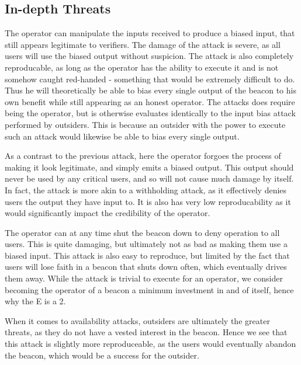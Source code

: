 \subsection{In-depth Threats}

The operator can manipulate the inputs received to produce a biased input, that still appears legitimate to verifiers. The damage of the attack is severe, as all users will use the biased output without suspicion. The attack is also completely reproducable, as long as the operator has the ability to execute it and is not somehow caught red-handed - something that would be extremely difficult to do. Thus he will theoretically be able to bias every single output of the beacon to his own benefit while still appearing as an honest operator. The attacks does require being the operator, but is otherwise evaluates identically to the input bias attack performed by outsiders. This is because an outsider with the power to execute such an attack would likewise be able to bias every single output.

As a contrast to the previous attack, here the operator forgoes the process of making it look legitimate, and simply emits a biased output. This output should never be used by any critical users, and so will not cause much damage by itself. In fact, the attack is more akin to a withholding attack, as it effectively denies users the output they have input to. It is also has very low reproducability as it would significantly impact the credibility of the operator.

The operator can at any time shut the beacon down to deny operation to all users. This is quite damaging, but ultimately not as bad as making them use a biased input. This attack is also easy to reproduce, but limited by the fact that users will lose faith in a beacon that shuts down often, which eventually drives them away. While the attack is trivial to execute for an operator, we consider becoming the operator of a beacon a minimum investment in and of itself, hence why the E is a 2.

When it comes to availability attacks, outsiders are ultimately the greater threats, as they do not have a vested interest in the beacon. Hence we see that this attack is slightly more reproduceable, as the users would eventually abandon the beacon, which would be a success for the outsider.